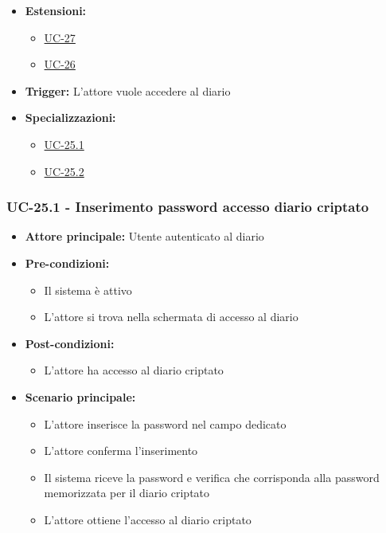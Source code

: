 \documentclass[a4paper,12pt]{article}
\newcommand{\ignoreglossary}{}
\begin{document}
\begin{itemize}
\begin{itemize}
    \end{itemize}
    \item \textbf{Estensioni:}
    \begin{itemize}
        \item \hyperref[subsec:UC-27]{UC-27}
        \item \hyperref[subsec:UC-26]{UC-26}
    \end{itemize}
        \item \textbf{Trigger:} L'attore vuole accedere al diario
        \item \textbf{Specializzazioni:}
    \begin{itemize}
        \item \hyperref[subsec:UC-25.1]{UC-25.1}
        \item \hyperref[subsec:UC-25.2]{UC-25.2}
    \end{itemize}

\end{itemize}

\subsubsection{UC-25.1 - Inserimento password accesso diario criptato} \label{subsec:UC-25.1}
\begin{itemize}
    \item \textbf{Attore principale:} Utente autenticato al diario
    \item \textbf{Pre-condizioni:}
    \begin{itemize}
        \item Il sistema è attivo
        \item L'attore si trova nella schermata di accesso al diario
    \end{itemize}
    \item \textbf{Post-condizioni:} 
    \begin{itemize}
        \item L'attore ha accesso al diario criptato
    \end{itemize}
    \item \textbf{Scenario principale:} 
    \begin{itemize}
        \item L'attore inserisce la password nel campo dedicato
        \item L'attore conferma l'inserimento
        \item Il sistema riceve la password e \ignoreglossary{verifica} che corrisponda alla password memorizzata per il diario criptato
        \item L'attore ottiene l'accesso al diario criptato
    \end{itemize}

\end{itemize}
\end{document}
